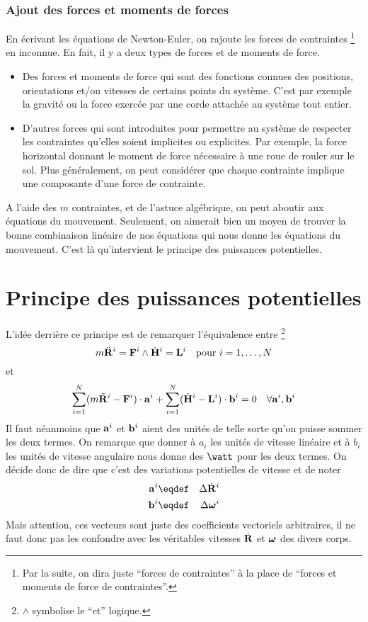 \subsubsection{Ajout des forces et moments de forces}
En écrivant les équations de Newton-Euler, on rajoute les forces de contraintes
\footnote{Par la suite, on dira juste ``forces de contraintes'' à la place de ``forces et moments de force de contraintes''.}
en inconnue.
En fait, il y a deux types de forces et de moments de force.
\begin{itemize}
  \item Des forces et moments de force qui sont des fonctions connues des positions, orientations et/ou vitesses de certains points du système.
    C'est par exemple la gravité ou la force exercée par une corde attachée au système tout entier.
  \item D'autres forces qui sont introduites pour permettre au système de respecter les contraintes qu'elles soient implicites ou explicites.
    Par exemple, la force horizontal donnant le moment de force nécessaire à une roue de rouler sur le sol.
    Plus généralement, on peut considérer que chaque contrainte implique une composante d'une force de contrainte.
\end{itemize}

A l'aide des $m$ contraintes, et de l'astuce algébrique, on peut aboutir aux équations du mouvement.
Seulement, on aimerait bien un moyen de trouver la bonne combinaison linéaire de nos équations qui nous donne les équations du mouvement.
C'est là qu'intervient le principe des puissances potentielles.

\section{Principe des puissances potentielles}

L'idée derrière ce principe est de remarquer l'équivalence entre
\footnote{$\land$ symbolise le ``et'' logique.}
\[
  m\ddot{\bf R}^i = {\bf F}^i \land
  \dot{{\bf H}}^i = {\bf L}^i
  \quad \text{pour } i = 1, \ldots, N
\]
et
\[
  \sum_{i=1}^N (m\ddot{\bf R}^i - {\bf F}^i) \cdot {\bf a}^i +
  \sum_{i=1}^N (\dot{{\bf H}}^i - {\bf L}^i) \cdot {\bf b}^i = 0
  \quad \forall {\bf a}^i, {\bf b}^i
\]
Il faut néanmoins que ${\bf a}^i$ et ${\bf b}^i$ aient des unités de telle sorte qu'on puisse sommer les deux termes.
On remarque que donner à $a_i$ les unités de vitesse linéaire et à $b_i$ les unités de vitesse angulaire nous donne des $\watt$ pour les deux termes.
On décide donc de dire que
c'est des variations potentielles de vitesse et de noter
\begin{eqnarray*}
  \fv{a}^i &\eqdef& \Delta \xgd^i\\
  \fv{b}^i &\eqdef& \Delta \omegaf^i
\end{eqnarray*}
Mais attention, ces vecteurs sont juste des coefficients vectoriels arbitraires,
il ne faut donc pas les confondre avec les véritables vitesses $\dot{\bf R}$ et ${\bm \omega}$ des divers corps.

